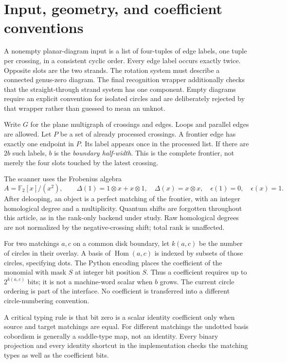 \documentclass[11pt]{article}
\theoremstyle{definition}\newtheorem{definition}[theorem]{Definition}
\theoremstyle{remark}\newtheorem{remark}[theorem]{Remark}
\newcommand{\F}{{\mathbb F_2}}
\newcommand{\Hom}{\operatorname{Hom}}
\newcommand{\code}[1]{\texttt{\detokenize{#1}}}
\begin{document}
\section{Input, geometry, and coefficient conventions}
\label{sec:model}
A nonempty planar-diagram input is a list of four-tuples of edge labels, one tuple
per crossing, in a consistent cyclic order. Every edge label occurs exactly
twice. Opposite slots are the two strands. The rotation system must describe a
connected genus-zero diagram. The final recognition wrapper additionally checks
that the straight-through strand system has one component. Empty diagrams require
an explicit convention for isolated circles and are deliberately rejected by that
wrapper rather than guessed to mean an unknot.

Write $G$ for the plane multigraph of crossings and edges. Loops and parallel
edges are allowed. Let $P$ be a set of already processed crossings. A frontier
edge has exactly one endpoint in $P$. Its label appears once in the processed
list. If there are $2b$ such labels, $b$ is the \emph{boundary half-width}.
This is the complete frontier, not merely the four slots touched by the latest
crossing.

The scanner uses the Frobenius algebra
\[
 A=\F[x]/(x^2),\qquad
 \Delta(1)=1\otimes x+x\otimes1,\quad
 \Delta(x)=x\otimes x,\quad \epsilon(1)=0,\quad\epsilon(x)=1.
\]
After delooping, an object is a perfect matching of the frontier, with an integer
homological degree and a multiplicity. Quantum shifts are forgotten throughout
this article, as in the rank-only backend under study. Raw homological degrees
are not normalized by the negative-crossing shift; total rank is unaffected.

For two matchings $a,c$ on a common disk boundary, let $k(a,c)$ be the number of
circles in their overlay. A basis of $\Hom(a,c)$ is indexed by subsets of those
circles, specifying dots. The Python encoding places the coefficient of the
monomial with mask $S$ at integer bit position $S$. Thus a coefficient requires
up to $2^{k(a,c)}$ bits; it is not a machine-word scalar when $b$ grows. The
current \code{Planar} circle ordering is part of the interface. No coefficient
is transferred into a different circle-numbering convention.

A critical typing rule is that bit zero is a scalar identity coefficient only
when source and target matchings are equal. For different matchings the undotted
basis cobordism is generally a saddle-type map, not an identity. Every binary
projection and every identity shortcut in the implementation checks the matching
types as well as the coefficient bits.
\end{document}
